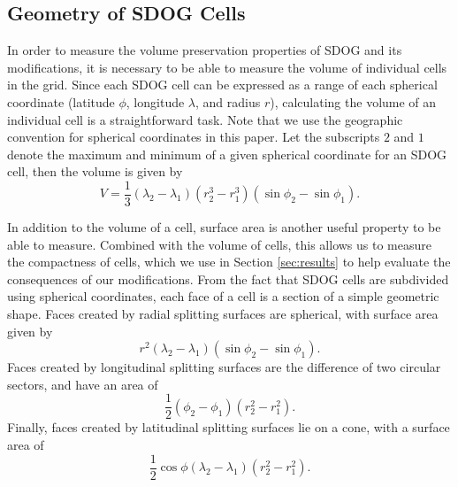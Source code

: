 \subsection{Geometry of SDOG Cells}
In order to measure the volume preservation properties of SDOG and its modifications, it is necessary to be able to measure the volume of individual cells in the grid. Since each SDOG cell can be expressed as a range of each spherical coordinate (latitude $\phi$, longitude $\lambda$, and radius $r$), calculating the volume of an individual cell is a straightforward task. Note that we use the geographic convention for spherical coordinates in this paper. Let the subscripts $2$ and $1$ denote the maximum and minimum of a given spherical coordinate for an SDOG cell, then the volume is given by \cite{yu2009sdog}
%
\begin{equation}
V = \frac{1}{3} \left( \lambda_{2} - \lambda_{1} \right) \left(r_{2}^{3} - r_{1}^{3} \right) \left(\sin\phi_{2} - \sin\phi_{1} \right).
\label{eq:volume}
\end{equation}%
%

In addition to the volume of a cell, surface area is another useful property to be able to measure. Combined with the volume of cells, this allows us to measure the compactness of cells, which we use in Section \ref{sec:results} to help evaluate the consequences of our modifications. From the fact that SDOG cells are subdivided using spherical coordinates, each face of a cell is a section of a simple geometric shape. Faces created by radial splitting surfaces are spherical, with surface area given by
%
\begin{equation}
r^{2} \left( \lambda_{2} - \lambda_{1} \right) \left( \sin\phi_{2} - \sin\phi_{1} \right).
\end{equation}%
%
Faces created by longitudinal splitting surfaces are the difference of two circular sectors, and have an area of
\begin{equation}
\frac{1}{2} \left( \phi_{2} - \phi_{1} \right) \left( r_{2}^{2} - r_{1}^{2} \right).
\end{equation}%
%
Finally, faces created by latitudinal splitting surfaces lie on a cone, with a surface area of
\begin{equation}
\frac{1}{2} \cos\phi \left( \lambda_{2} - \lambda_{1} \right) \left( r_{2}^{2} - r_{1}^{2} \right).
\end{equation}%


